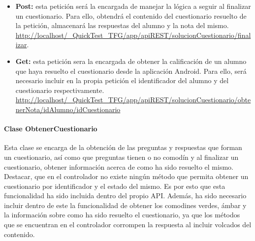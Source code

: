\begin{itemize}

	\item \textbf{Post:} esta petición será la encargada de manejar la lógica a seguir al finalizar un cuestionario. Para ello, obtendrá el contenido del cuestionario resuelto de la petición, almacenará las respuestas del alumno y la nota del mismo. \url{http://localhost/_QuickTest_TFG/app/apiREST/solucionCuestionario/finalizar}.
	
	\item \textbf{Get:} esta petición sera la encargada de obtener la calificación de un alumno que haya resuelto el cuestionario desde la aplicación Android. Para ello, será necesario incluir en la propia petición el identificador del alumno y del cuestionario respectivamente. \url{http://localhost/_QuickTest_TFG/app/apiREST/solucionCuestionario/obtenerNota/idAlumno/idCuestionario}
\end{itemize}


\paragraph{Clase ObtenerCuestionario}

Esta clase se encarga de la obtención de las preguntas y respuestas que forman un cuestionario, así como que preguntas tienen o no comodín y al finalizar un cuestionario, obtener información acerca de como ha sido resuelto el mismo. Destacar,  que en el controlador no existe ningún método que permita obtener un cuestionario por identificador y el estado del mismo. Es por esto que esta funcionalidad ha sido incluida dentro del propio API. Además, ha sido necesario incluir dentro de este la funcionalidad de obtener los comodines verdes, ámbar y la información sobre como ha sido resuelto el cuestionario, ya que los métodos que se encuentran en el controlador corrompen la respuesta al incluir volcados del contenido.

